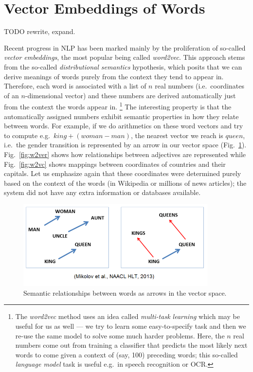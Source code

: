 \section{Vector Embeddings of Words}
\label{sec:embeddings}

TODO rewrite, expand.

Recent progress in NLP has been marked mainly by the proliferation of
so-called \textit{vector embeddings}, the most popular being called
\textit{word2vec}.  This approach stems from the so-called \textit{distributional semantics}
hypothesis, which posits that we can derive meanings of words purely
from the context they tend to appear in.  Therefore, each word is
associated with a list of $n$ real numbers (i.e.\ coordinates of
an $n$-dimensional vector) and these numbers are derived automatically
just from the context the words appear in.%
\footnote{The \textit{word2vec} method uses an idea called \textit{multi-task learning}
	which may be useful for us as well --- we try to learn
	some easy-to-specify task and then we re-use the same model to
	solve some much harder problems.  Here, the $n$ real numbers
	come out from training a classifier that predicts the most likely
	next words to come given a context of (say, 100) preceding words;
	this so-called \textit{language model} task is useful e.g.\ in
	speech recognition or OCR.}
The interesting property is that the automatically assigned numbers
exhibit semantic properties in how they relate between words.
For example, if we do arithmetics on these word vectors and try
to compute e.g.\ $king + (woman - man)$, the nearest vector we reach
is $queen$, i.e.\ the gender transition is represented by an arrow
in our vector space (Fig.~\ref{fig:w2vg}).
Fig.~\ref{fig:w2ver} shows how relationships between adjectives are represented
while Fig.~\ref{fig:w2vc} shows mappings between coordinates of countries
and their capitals.  Let us emphasize again that these coordinates were
determined purely based on the context of the words (in Wikipedia or
millions of news articles); the system did not have any extra information
or databases available.

\begin{figure}[ht]
	\centering
	\includegraphics[width=10cm]{kingqueen.png}
	\caption{Semantic relationships between words as arrows in the vector space. \citep{WordVecLingReg}}
	\label{fig:w2vg}
\end{figure}


